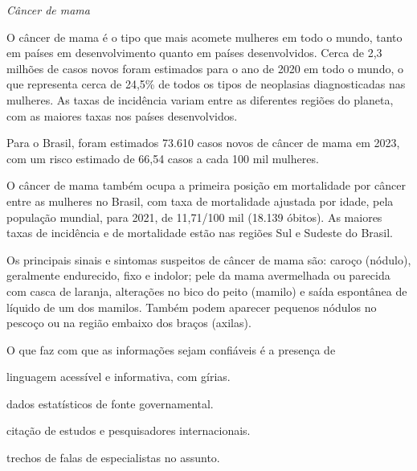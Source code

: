 \begin{myquote}
\textit{Câncer de mama}

O câncer de mama é o tipo que mais acomete mulheres em todo o mundo, tanto em
países em desenvolvimento quanto em países desenvolvidos. Cerca de 2,3 milhões
de casos novos foram estimados para o ano de 2020 em todo o mundo, o que
representa cerca de 24,5\% de todos os tipos de neoplasias diagnosticadas nas
mulheres. As taxas de incidência variam entre as diferentes regiões do
planeta, com as maiores taxas nos países desenvolvidos.

Para o Brasil, foram estimados 73.610 casos novos de câncer de mama em 2023,
com um risco estimado de 66,54 casos a cada 100 mil mulheres.

O câncer de mama também ocupa a primeira posição em mortalidade por câncer
entre as mulheres no Brasil, com taxa de mortalidade ajustada por idade, pela
população mundial, para 2021, de 11,71/100 mil (18.139 óbitos). As maiores
taxas de incidência e de mortalidade estão nas regiões Sul e Sudeste do
Brasil.

Os principais sinais e sintomas suspeitos de câncer de mama são: caroço
(nódulo), geralmente endurecido, fixo e indolor; pele da mama avermelhada ou
parecida com casca de laranja, alterações no bico do peito (mamilo) e saída
espontânea de líquido de um dos mamilos. Também podem aparecer pequenos
nódulos no pescoço ou na região embaixo dos braços (axilas).


\end{myquote}

O que faz com que as informações sejam confiáveis é a presença de

\begin{escolha}
    
    \item linguagem acessível e informativa, com gírias.
    
    \item dados estatísticos de fonte governamental.

    \item citação de estudos e pesquisadores internacionais.
    
    \item trechos de falas de especialistas no assunto.

\end{escolha}

